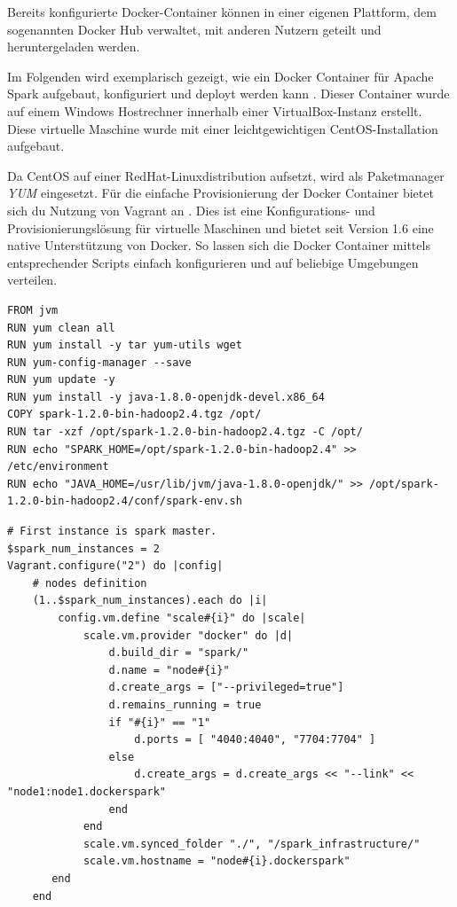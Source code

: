 Bereits konfigurierte Docker-Container können in einer eigenen Plattform, dem sogenannten Docker Hub verwaltet, mit anderen Nutzern geteilt und heruntergeladen werden. 

Im Folgenden wird exemplarisch gezeigt, wie ein Docker Container für Apache Spark aufgebaut, konfiguriert und deployt werden kann . Dieser Container wurde auf einem Windows Hostrechner innerhalb einer VirtualBox-Instanz erstellt. Diese virtuelle Maschine wurde mit einer leichtgewichtigen CentOS-Installation aufgebaut. 

Da CentOS auf einer RedHat-Linuxdistribution aufsetzt, wird als Paketmanager \textit{YUM} eingesetzt. Für die einfache Provisionierung der Docker Container bietet sich du Nutzung von Vagrant an . Dies ist eine Konfigurations- und Provisionierungslösung für virtuelle Maschinen und bietet seit Version 1.6 eine native Unterstützung von Docker. So lassen sich die Docker Container mittels entsprechender Scripts einfach konfigurieren und auf beliebige Umgebungen verteilen. 



\begin{lstlisting}[label=vagrant setup jvm-spark,caption=Setup Spark mit eigener JVM]
FROM jvm
RUN yum clean all
RUN yum install -y tar yum-utils wget
RUN yum-config-manager --save 
RUN yum update -y
RUN yum install -y java-1.8.0-openjdk-devel.x86_64
COPY spark-1.2.0-bin-hadoop2.4.tgz /opt/
RUN tar -xzf /opt/spark-1.2.0-bin-hadoop2.4.tgz -C /opt/
RUN echo "SPARK_HOME=/opt/spark-1.2.0-bin-hadoop2.4" >> /etc/environment
RUN echo "JAVA_HOME=/usr/lib/jvm/java-1.8.0-openjdk/" >> /opt/spark-1.2.0-bin-hadoop2.4/conf/spark-env.sh

\end{lstlisting}

\begin{lstlisting}[label=setup spark,caption=Vagrant Provisionierungs-Skript für Spark]
# First instance is spark master.
$spark_num_instances = 2
Vagrant.configure("2") do |config|
    # nodes definition
    (1..$spark_num_instances).each do |i|
        config.vm.define "scale#{i}" do |scale|
            scale.vm.provider "docker" do |d|
                d.build_dir = "spark/"
                d.name = "node#{i}"
                d.create_args = ["--privileged=true"]
                d.remains_running = true
                if "#{i}" == "1"
                    d.ports = [ "4040:4040", "7704:7704" ] 
                else
                    d.create_args = d.create_args << "--link" << "node1:node1.dockerspark"
                end
            end
            scale.vm.synced_folder "./", "/spark_infrastructure/"
            scale.vm.hostname = "node#{i}.dockerspark"
       end 
    end

\end{lstlisting}




